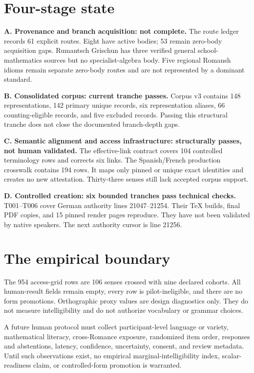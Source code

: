 \documentclass[10pt,a4paper]{article}
\begin{document}
\section*{Four-stage state}

\textbf{A. Provenance and branch acquisition: not complete.}
The route ledger records 61 explicit routes. Eight have active bodies; 53 remain
zero-body acquisition gaps. Rumantsch Grischun has three verified general school-
mathematics sources but no specialist-algebra body. Five regional Romansh idioms
remain separate zero-body routes and are not represented by a dominant standard.

\textbf{B. Consolidated corpus: current tranche passes.}
Corpus v3 contains 148 representations, 142 primary unique records, six
representation aliases, 66 counting-eligible records, and five excluded records.
Passing this structural tranche does not close the documented branch-depth gaps.

\textbf{C. Semantic alignment and access infrastructure: structurally passes,
not human validated.}
The effective-link contract covers 104 controlled terminology rows and corrects
six links. The Spanish/French production crosswalk contains 194 rows. It maps only
pinned or unique exact identities and creates no new attestation. Thirty-three
senses still lack accepted corpus support.

\textbf{D. Controlled creation: six bounded tranches pass technical checks.}
T001--T006 cover German authority lines 21047--21254. Their TeX builds, final PDF
copies, and 15 pinned render pages reproduce. They have not been validated by
native speakers. The next authority cursor is line 21256.

\newpage
\section*{The empirical boundary}

The 954 access-grid rows are 106 senses crossed with nine declared cohorts. All
human-result fields remain empty, every row is pilot-ineligible, and there are no
form promotions. Orthographic proxy values are design diagnostics only. They do
not measure intelligibility and do not authorize vocabulary or grammar choices.

A future human protocol must collect participant-level language or variety,
mathematical literacy, cross-Romance exposure, randomized item order, responses
and abstentions, latency, confidence, uncertainty, consent, and review metadata.
Until such observations exist, no empirical marginal-intelligibility index,
scalar-readiness claim, or controlled-form promotion is warranted.
\end{document}
